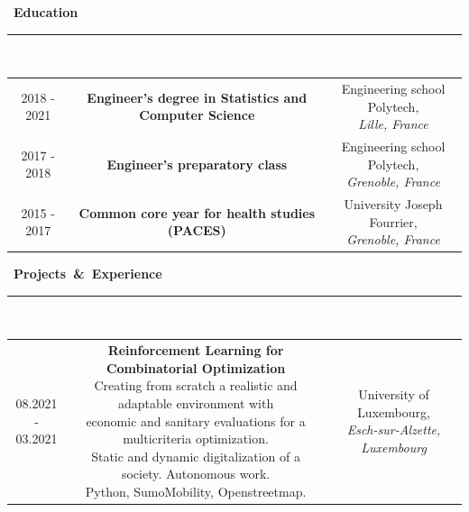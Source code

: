 \documentclass[a4paper]{article}
\begin{document}
\begin{titlepage}
\selectfont


\mbox{\Large \comfortaa \textbf{ \faGraduationCap \hspace{0.2cm} Education}}\\
\rule{0.8\linewidth}{0.01mm}\\[0.2cm]
\begin{tabular}{ccc}
\parbox[]{0.11\linewidth}{2018 - 2021\\} 
&
\parbox[]{0.59\linewidth}{\large \textbf{Engineer's degree in Statistics and Computer Science}\\}
&
\parbox[]{0.3\linewidth}{Engineering school Polytech,\\ \textit{Lille, France}\\}

\\

\parbox[]{0.11\linewidth}{2017 - 2018\\} 
&
\parbox[]{0.59\linewidth}{\large \textbf{Engineer's preparatory class}\\}
&
\parbox[]{0.3\linewidth}{Engineering school Polytech,\\ \textit{Grenoble, France}\\}

\\

\parbox[]{0.11\linewidth}{2015 - 2017\\} 
&
\parbox[]{0.59\linewidth}{\large \textbf{Common core year for health studies (PACES)}\\}
&
\parbox[]{0.3\linewidth}{University Joseph Fourrier,\\ \textit{Grenoble, France}\\}
\end{tabular}

\medskip

\mbox{\Large \comfortaa \textbf{ \faHandshake \hspace{0.2cm} Projects \& Experience}}\\
\rule{0.8\linewidth}{0.01mm}\\[0.2cm]
\begin{tabular}{ccc}
\parbox[]{0.11\linewidth}{08.2021 -\\ 03.2021\\} 
&
\parbox[]{0.59\linewidth}{\textbf{\large Reinforcement Learning for Combinatorial Optimization}\\
Creating from scratch a realistic and adaptable environment with \\economic and sanitary evaluations for a multicriteria optimization.\\
Static and dynamic digitalization of a society. Autonomous work.\\
Python, SumoMobility, Openstreetmap.\\}
&
\parbox[]{0.3\linewidth}{University of Luxembourg,\\
\textit{Esch-sur-Alzette, Luxembourg}\\}


\end{tabular}
\end{titlepage}
\end{document}
